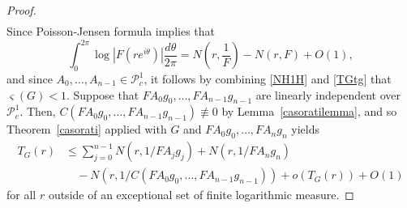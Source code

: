 \documentclass{amsart}
\theoremstyle{definition}
\numberwithin{equation}{section}
\numberwithin{theorem}{section}
\begin{document}
\begin{proof}
\begin{equation}
\begin{split}
  	\end{split}
	\end{equation}
Since Poisson-Jensen formula implies that
	\begin{equation}\label{PJformula}
	\int_0^{2\pi}\log|F(re^{i\theta})|\frac{d\theta}{2\pi}=N\left(r,\frac{1}{F}\right)-N(r,F)+O(1),
	\end{equation}
and since $A_0,\ldots,A_{n-1}\in\mathcal{P}^1_c$, it follows by combining \eqref{NH1H} and \eqref{TGtg} that $\varsigma(G)<1$. Suppose that $FA_0g_0,\ldots,FA_{n-1}g_{n-1}$ are linearly independent over $\mathcal{P}^1_c$. Then, $C(FA_0g_0,\ldots, FA_{n-1}g_{n-1})\not\equiv0$ by Lemma~\ref{casoratilemma}, and so Theorem~\ref{casorati} applied with $G$ and $FA_0g_0,\ldots,FA_ng_n$ yields
    \begin{equation}\label{thth}
    \begin{split}
    T_G(r) &\leq \sum_{j=0}^{n-1} N\left(r,1/FA_jg_j\right)
    + N\left(r,1/FA_ng_n\right)\\&\quad - N\left(r,1/C(FA_0g_0,\ldots, FA_{n-1}g_{n-1})\right)
    +o(T_G(r))+O(1)
    \end{split}
    \end{equation}
for all $r$ outside of an exceptional set of finite logarithmic
measure.


\end{proof}
\end{document}
